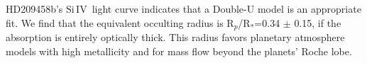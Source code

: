 \documentclass[manuscript]{aastex}
\newcommand{\siIV}{\ensuremath{\mathrm{Si}\,\scriptstyle \mathrm{IV}}}
\newcommand{\p}{R$_p$/R$_*$}
\begin{document}
HD209458b's \siIV\ light curve indicates that a Double-U model is an appropriate fit. We find that the equivalent occulting radius is \p=0.34 $\pm$ 0.15, if the absorption is entirely optically thick. This radius favors planetary atmosphere models with high metallicity and for mass flow beyond the planets' Roche lobe.
\\

  
\end{document}
